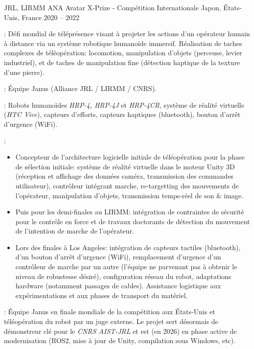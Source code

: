 \begin{cventries}
  \cventry
  {JRL, LIRMM} %
  {ANA Avatar X-Prize - Compétition Internationale} %
  {Japon, États-Unis, France} %
  {2020 -- 2022} %
  {
    \begin{cvitems}
    \item {} : Défi mondial de téléprésence visant à projeter les actions d'un
      opérateur humain à distance via un système robotique humanoïde immersif. Réalisation de taches
      complexes de téléopération: locomotion, manipulation d'objets (perceuse, levier industriel), et de
      taches de manipulation fine (détection haptique de la texture d'une pierre).
    \item {} : Équipe Janus (Alliance JRL / LIRMM / CNRS).
    \item {} : Robots humanoïdes \emph{HRP-4, HRP-4J} et
      \emph{HRP-4CR}, système de réalité virtuelle (\emph{HTC Vive}), capteurs d'efforts, capteurs haptiques
      (bluetooth), bouton d'arrêt d'urgence (WiFi).
    \item {} :
      \begin{itemize}
        \item Concepteur de l'architecture logicielle initiale de téléopération pour la phase de sélection
          initiale: système de réalité virtuelle dans le moteur Unity 3D (réception et affichage des données
          caméra, transmission des commandes utilisateur), contrôleur intégrant marche, re-targetting des
          mouvements de l'opérateur, manipulation d'objets, transmission temps-réel de son \& image.
        \item Puis pour les demi-finales au LIRMM: intégration de contraintes de sécurité pour le contrôle en
          force et de travaux doctorants de détection du mouvement de l'intention de marche de l'opérateur.
        \item Lors des finales à Los Angeles: intégration de capteurs tactiles (bluetooth), d'un bouton
          d'arrêt d'urgence (WiFi), remplacement d'urgence d'un contrôleur de marche par un autre (l'équipe
          ne parvenant pas à obtenir le niveau de robustesse désiré), configuration réseau du robot,
          adaptations hardware (notamment passages de cables). Assistance logistique aux expérimentations et
          aux phases de transport du matériel.
      \end{itemize}
    \item {} : Équipe Janus en finale mondiale de la compétition aux États-Unis et
      téléopération du robot par un juge externe. Le projet sert désormais de démonstreur clé pour le
      \emph{CNRS AIST-JRL} et est (en 2026) en phase active de modernisation (ROS2, mise à jour de Unity,
      compilation sous Windows, etc).
    \end{cvitems}
  }


\end{cventries}
